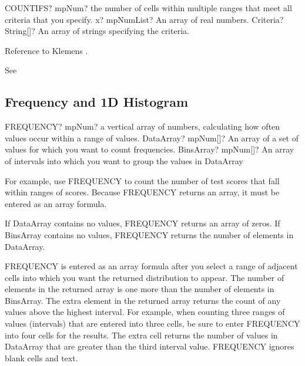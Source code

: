 \vspace{0.6cm}
\begin{mpFunctionsExtract}
	\mpWorksheetFunctionTwoNotImplemented
	{COUNTIFS? mpNum? the number of cells within multiple ranges that meet all criteria that you specify.}
	{x? mpNumList? An array of real numbers.}
	{Criteria? String[]? An array of strings specifying the criteria.}
\end{mpFunctionsExtract}



Reference to Klemens  \citep{Klemens2008}.

See \cite{Ogita_2005}


\subsection{Frequency and 1D Histogram}

\begin{mpFunctionsExtract}
	\mpWorksheetFunctionTwoNotImplemented
	{FREQUENCY? mpNum? a vertical array of numbers, calculating how often values occur within a range of values.}
	{DataArray? mpNum[]? An array of a set of values for which you want to count frequencies.}
	{BinsArray? mpNum[]? An array of intervals into which you want to group the values in \textsf{DataArray}}
\end{mpFunctionsExtract}

\vspace{0.3cm}
For example, use \textsf{FREQUENCY} to count the number of test scores that fall within ranges of scores. Because \textsf{FREQUENCY} returns an array, it must be entered as an array formula.

If \textsf{DataArray} contains no values, \textsf{FREQUENCY} returns an array of zeros. If  \textsf{BinsArray} contains no values, \textsf{FREQUENCY} returns the number of elements in \textsf{DataArray}.


\vspace{0.3cm}
\textsf{FREQUENCY} is entered as an array formula after you select a range of adjacent cells into which you want the returned distribution to appear. 
The number of elements in the returned array is one more than the number of elements in \textsf{BinsArray}. The extra element in the returned array returns the count of any values above the highest interval. For example, when counting three ranges of values (intervals) that are entered into three cells, be sure to enter \textsf{FREQUENCY} into four cells for the results. The extra cell returns the number of values in \textsf{DataArray} that are greater than the third interval value. 
\textsf{FREQUENCY} ignores blank cells and text.

